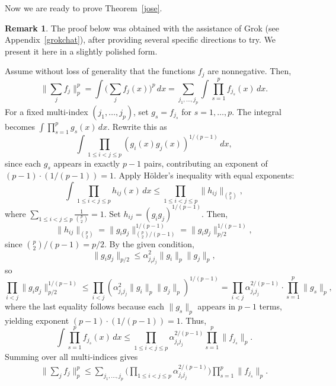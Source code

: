 \documentclass[11pt]{article}
\theoremstyle{definition}
\newtheorem{remark}[theorem]{Remark}
\newcommand{\1}{\mathbf{1}}
\begin{document}
\vskip0.5cm 

Now we are ready to prove Theorem~\ref{jose}. 
\begin{remark}
The proof below was obtained with the assistance of Grok (see Appendix~\ref{grokchat}), after providing several specific directions to try. We present it here in a slightly polished form.
\end{remark}

Assume without loss of generality that the functions $f_j$ are nonnegative. Then,
$$
\Big\| \sum_j f_j \Big\|_p^p = \int \Big( \sum_j f_j(x) \Big)^p \, dx = \sum_{j_1, \dots, j_p} \int \prod_{s=1}^p f_{j_s}(x) \, dx.
$$
For a fixed multi-index $(j_1, \dots, j_p)$, set $g_s = f_{j_s}$ for $s = 1, \dots, p$. The integral becomes $\int \prod_{s=1}^p g_s(x) \, dx$.
Rewrite this as
$$\int \prod_{1 \leq i < j \leq p} (g_i(x) g_j(x))^{1/(p-1)} \, dx,$$
since each $g_s$ appears in exactly $p-1$ pairs, contributing an exponent of $(p-1) \cdot (1/(p-1)) = 1$.
Apply H\"older's inequality with equal exponents:
$$\int \prod_{1 \leq i < j \leq p} h_{ij}(x) \, dx \leq \prod_{1 \leq i < j \leq p} \| h_{ij} \|_{\binom{p}{2}},$$
where $\sum_{1 \leq i < j \leq p} \frac{1}{\binom{p}{2}} = 1$.
Set $h_{ij} = (g_i g_j)^{1/(p-1)}$. Then,
$$\| h_{ij} \|_{\binom{p}{2}} = \| g_i g_j \|_{\binom{p}{2} / (p-1)}^{1/(p-1)} = \| g_i g_j \|_{p/2}^{1/(p-1)},$$
since $\binom{p}{2} / (p-1) = p/2$.
By the given condition,
$$\| g_i g_j \|_{p/2} \leq \alpha_{j_i j_j}^2 \| g_i \|_p \| g_j \|_p,$$
so
$$\prod_{i < j} \| g_i g_j \|_{p/2}^{1/(p-1)} \leq \prod_{i < j} (\alpha_{j_i j_j}^2 \| g_i \|_p \| g_j \|_p)^{1/(p-1)} = \prod_{i < j} \alpha_{j_i j_j}^{2/(p-1)} \cdot \prod_{s=1}^p \| g_s \|_p,$$
where the last equality follows because each $\| g_s \|_p$ appears in $p-1$ terms, yielding exponent $(p-1) \cdot (1/(p-1)) = 1$.
Thus,
$$\int \prod_{s=1}^p f_{j_s}(x) \, dx \leq \prod_{1 \leq i < j \leq p} \alpha_{j_i j_j}^{2/(p-1)} \prod_{s=1}^p \| f_{j_s} \|_p.$$
Summing over all multi-indices gives
\begin{align}\label{fin1}
\Big\| \sum_j f_j \Big\|_p^p \leq \sum_{j_1, \dots, j_p} \Big( \prod_{1 \leq i < j \leq p} \alpha_{j_i j_j}^{2/(p-1)} \Big) \prod_{s=1}^p \| f_{j_s} \|_p.
\end{align}
\end{document}
